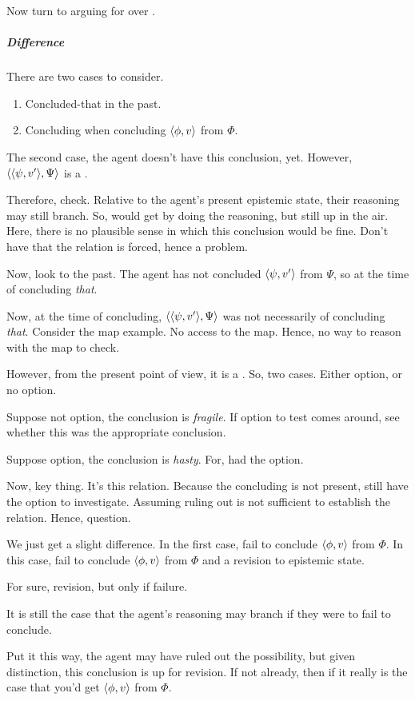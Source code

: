 \begin{note}
  Now turn to arguing for \iCS{} over \iCSm{}.
\end{note}

\subparagraph{Difference}

\begin{note}
  There are two cases to consider.
  \begin{enumerate}
  \item
    Concluded-that in the past.
  \item
    Concluding when concluding \(\langle \phi, v \rangle\) from \(\Phi\).
  \end{enumerate}

  The second case, the agent doesn't have this conclusion, yet.
  However, \(\langle \langle \psi, v' \rangle, \Psi \rangle\) is a \requ{}.

  Therefore, check.
  Relative to the agent's present epistemic state, their reasoning may still branch.
  So, would get by doing the reasoning, but still up in the air.
  Here, there is no plausible sense in which this conclusion would be fine.
  Don't have that the relation is forced, hence a problem.
\end{note}

\begin{note}
  Now, look to the past.
  The agent has not concluded \(\langle \psi, v' \rangle\) from \(\Psi\), so at the time of concluding \emph{that}.

  Now, at the time of concluding, \(\langle \langle \psi, v' \rangle, \Psi \rangle\) was not necessarily \requ{} of concluding \emph{that}.
  Consider the map example.
  No access to the map.
  Hence, no way to reason with the map to check.

  However, from the present point of view, it is a \requ{}.
  So, two cases.
  Either option, or no option.

  Suppose not option, the conclusion is \emph{fragile}.
  If option to test comes around, see whether this was the appropriate conclusion.

  Suppose option, the conclusion is \emph{hasty}.
  For, had the option.

  Now, key thing.
  It's this relation.
  Because the concluding is not present, still have the option to investigate.
  Assuming ruling out is not sufficient to establish the relation.
  Hence, question.

  We just get a slight difference.
  In the first case, fail to conclude \(\langle \phi, v \rangle\) from \(\Phi\).
  In this case, fail to conclude \(\langle \phi, v \rangle\) from \(\Phi\) and a revision to epistemic state.

  For sure, revision, but only if failure.

  It is still the case that the agent's reasoning may branch if they were to fail to conclude.

  Put it this way, the agent may have ruled out the possibility, but given distinction, this conclusion is up for revision.
  If not already, then if it really is the case that you'd get \(\langle \phi, v \rangle\) from \(\Phi\).
\end{note}

